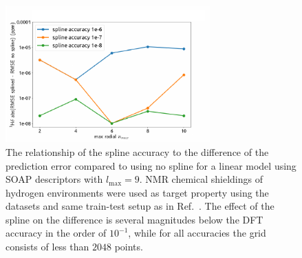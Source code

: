 
\begin{figure}
    \centering
    \includegraphics[width=0.7\textwidth]{fig/spline-accuracy-v2.pdf}
    \caption{The relationship of the spline accuracy to the difference of the prediction error compared to using no spline for a linear model using SOAP descriptors with $l_\textrm{max}=9$.
      NMR chemical shieldings of hydrogen environments were used as target property using the datasets and same train-test setup as in Ref.~\cite{paruzzo2018chemical}.
    The effect of the spline on the difference is several magnitudes below the DFT accuracy in the order of $10^{-1}$, while for all accuracies the grid consists of less than $2048$ points.}
    \label{fig:chemical_shift-spline}
\end{figure}

